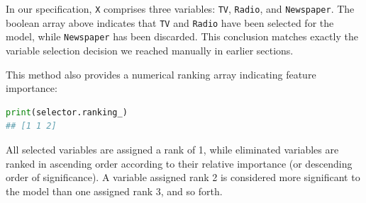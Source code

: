 In our specification, \texttt{X} comprises three variables: \texttt{TV}, \texttt{Radio}, and \texttt{Newspaper}. The boolean array above indicates that \texttt{TV} and \texttt{Radio} have been selected for the model, while \texttt{Newspaper} has been discarded. This conclusion matches exactly the variable selection decision we reached manually in earlier sections.

This method also provides a numerical ranking array indicating feature importance:
\begin{lstlisting}[language=Python]
print(selector.ranking_)
## [1 1 2]
\end{lstlisting}

\begin{observacion}
	All selected variables are assigned a rank of 1, while eliminated variables are ranked in ascending order according to their relative importance (or descending order of significance). A variable assigned rank 2 is considered more significant to the model than one assigned rank 3, and so forth.
\end{observacion}

